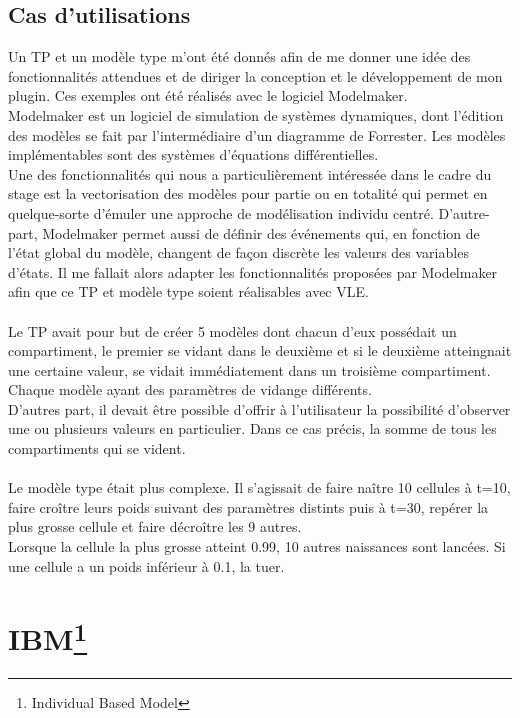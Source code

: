 \subsection{Cas d'utilisations}
Un TP et un modèle type m'ont été donnés afin de me donner une idée des fonctionnalités attendues et de diriger la conception et le développement de mon plugin. Ces exemples ont été réalisés avec le logiciel Modelmaker.\\
Modelmaker est un logiciel de simulation de systèmes dynamiques, dont l'édition des modèles se fait par l'intermédiaire d'un diagramme de Forrester. Les modèles implémentables sont des systèmes d'équations différentielles.\\
Une des fonctionnalités qui nous a particulièrement intéressée dans le cadre du stage est la vectorisation des modèles pour partie ou en totalité qui permet en quelque-sorte d'émuler une approche de modélisation individu centré. D'autre-part, Modelmaker permet aussi de définir des événements qui, en fonction de l'état global du modèle, changent de façon discrète les valeurs des variables d'états. Il me fallait alors adapter les fonctionnalités proposées par Modelmaker afin que ce TP et modèle type soient réalisables avec VLE.\\
\\
Le TP avait pour but de créer 5 modèles dont chacun d'eux possédait un compartiment, le premier se vidant dans le deuxième et si le deuxième atteingnait une certaine valeur, se vidait immédiatement dans un troisième compartiment. Chaque modèle ayant des paramètres de vidange différents.\\
D'autres part, il devait être possible d'offrir à l'utilisateur la possibilité d'observer une ou plusieurs valeurs en particulier. Dans ce cas précis, la somme de tous les compartiments qui se vident.\\
\\
Le modèle type était plus complexe. Il s'agissait de faire naître 10 cellules à t=10, faire croître leurs poids suivant des paramètres distints puis à t=30, repérer la plus grosse cellule et faire décroître les 9 autres.\\ Lorsque la cellule la plus grosse atteint 0.99, 10 autres naissances sont lancées. Si une cellule a un poids inférieur à 0.1, la tuer.
 
\section[IBM] {IBM\footnote{Individual Based Model}}
